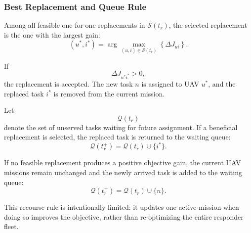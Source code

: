 \documentclass[conference]{IEEEtran}
\begin{document}
\subsubsection{Best Replacement and Queue Rule}

Among all feasible one-for-one replacements in $\mathcal{S}(t_r)$, the selected replacement is the one with the largest gain:
\begin{equation}
\boxed{
(u^*,i^*)
=
\arg\max_{(u,i)\in\mathcal{S}(t_r)}
\left\{
\Delta J_{ui}
\right\}.
}
\end{equation}

If
\begin{equation}
\Delta J_{u^*i^*}>0,
\end{equation}
the replacement is accepted. The new task $n$ is assigned to UAV $u^*$, and the replaced task $i^*$ is removed from the current mission.

Let
\[
\mathcal{Q}(t_r)
\]
denote the set of unserved tasks waiting for future assignment. If a beneficial replacement is selected, the replaced task is returned to the waiting queue:
\begin{equation}
\mathcal{Q}(t_r^+)
=
\mathcal{Q}(t_r)\cup\{i^*\}.
\end{equation}

If no feasible replacement produces a positive objective gain, the current UAV missions remain unchanged and the newly arrived task is added to the waiting queue:
\begin{equation}
\mathcal{Q}(t_r^+)
=
\mathcal{Q}(t_r)\cup\{n\}.
\end{equation}

This recourse rule is intentionally limited: it updates one active mission when doing so improves the objective, rather than re-optimizing the entire responder fleet.
\end{document}
